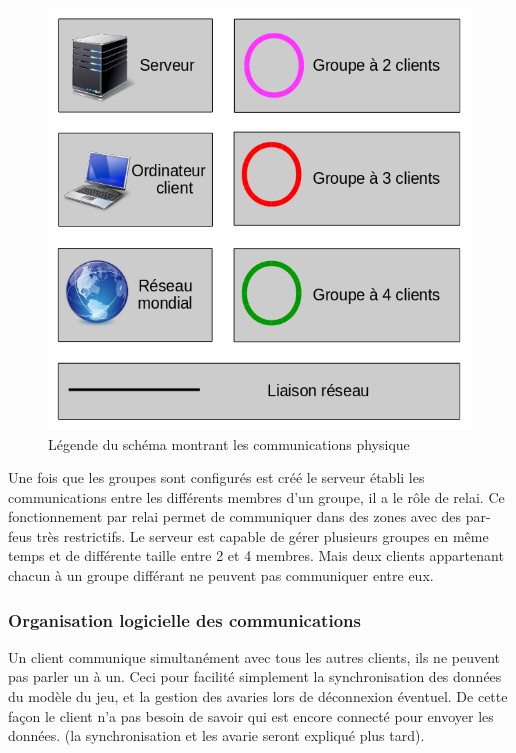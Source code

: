 \documentclass[a4paper,11pt]{report}
\begin{document}
   \begin{figure}[th]
      \begin{center}
        \includegraphics[scale=0.4]{Assets/l_r_1.png}
        \caption{Légende du schéma montrant les communications physique}
        \label{leSchémaCom}
      \end{center}
    \end{figure}
    
  
  Une fois que les groupes sont configurés est créé le serveur établi les communications entre les différents membres d’un groupe, il a le rôle de relai. Ce fonctionnement par relai permet de communiquer dans des zones avec des par-feus très restrictifs.
Le serveur est capable de gérer plusieurs groupes en même temps et de différente taille entre 2 et 4 membres. Mais deux clients appartenant chacun à un groupe différant ne peuvent pas communiquer entre eux.

\subsubsection{Organisation logicielle des communications}

  Un client communique simultanément avec tous les autres clients, ils ne peuvent pas parler un à un. Ceci pour facilité simplement la synchronisation des données du modèle du jeu, et la gestion des avaries lors de déconnexion éventuel. De cette façon le client n’a pas besoin de savoir qui est encore connecté pour envoyer les données. (la synchronisation et les avarie seront expliqué plus tard).
  
\end{document}

